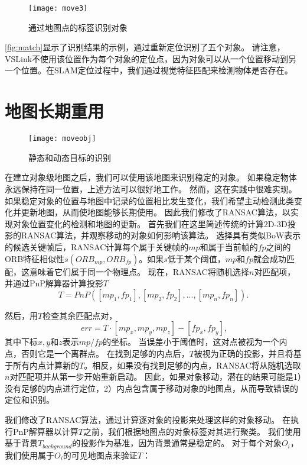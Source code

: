 \begin{figure}[htbp]
	\centering
	\texttt{[image: move3]}
	\caption{通过地图点的标签识别对象}
	\label{fig:match}
\end{figure}

\autoref{fig:match}显示了识别结果的示例，通过重新定位识别了五个对象。
请注意，VSLink不使用该位置作为每个对象的定位点，因为对象可以从一个位置移动到另一个位置。在SLAM定位过程中，我们通过视觉特征匹配来检测物体是否存在。


\section{地图长期重用}

\begin{figure}[htbp]
	\centering
	\texttt{[image: moveobj]}
	\caption{静态和动态目标的识别}
	\label{fig:move}
\end{figure}

在建立对象级地图之后，我们可以使用该地图来识别稳定的对象。
如果稳定物体永远保持在同一位置，上述方法可以很好地工作。
然而，这在实践中很难实现。
如果稳定对象的位置与地图中记录的位置相比发生变化，我们希望主动检测此类变化并更新地图，从而使地图能够长期使用。
因此我们修改了RANSAC算法，以实现对象位置变化的检测和地图的更新。
首先我们在这里简述传统的计算2D-3D投影的RANSAC\cite{derpanis2010overview}算法，并观察移动的对象如何影响该算法。
选择具有类似BoW表示的候选关键帧后，RANSAC计算每个属于关键帧的$mp$和属于当前帧的$fp$之间的ORB特征相似性$s(ORB_{mp}, ORB_{fp})$。如果$s$低于某个阈值，$mp$和$fp$就会成功匹配，这意味着它们属于同一个物理点。
现在，RANSAC将随机选择$n$对匹配项，并通过PnP解算器计算投影$T$
\begin{equation}\label{equ:pnp}
    T = PnP([mp_1, fp_1],[mp_2, fp_2], ..., [mp_n, fp_n]).
\end{equation} 

然后，用$T$检查其余匹配点对，
\begin{equation}\label{equ:check}
    \
    err = T \cdot [mp_x, mp_y, mp_z] - [fp_x, fp_y],
\end{equation} 
其中下标$x,y$和$z$表示$mp/fp$的坐标。
当误差小于阈值时，这对点被视为一个内点，否则它是一个离群点。
在找到足够的内点后，$T$被视为正确的投影，并且将基于所有内点计算新的$T$。相反，如果没有找到足够的内点，RANSAC将从随机选取$n$对匹配项并从第一步开始重新启动。
因此，如果对象移动，潜在的结果可能是1）没有足够的内点进行定位，2）内点包含属于移动对象的地图点，从而导致错误的定位和识别。

我们修改了RANSAC算法，通过计算逐对象的投影来处理这样的对象移动。
在执行PnP解算器以计算$T$之前，我们根据地图点的对象标签对其进行聚类。
我们使用基于背景$T_{background}$的投影作为基准，因为背景通常是稳定的。
对于每个对象$O_i$，我们使用属于$O_i$的可见地图点来验证$T$：

